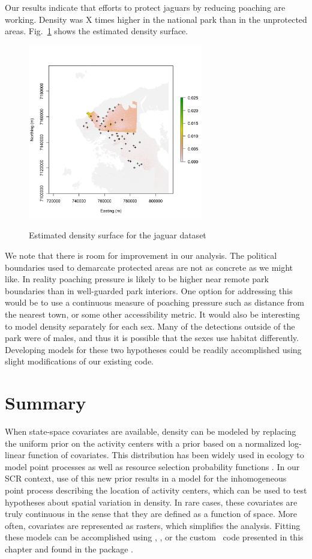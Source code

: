 Our results
indicate that efforts to protect jaguars by reducing poaching are
working. Density was X times higher in the national park than in the
unprotected areas. Fig.~\ref{ch9:fig:Dsurface} shows the estimated
density surface.

\begin{figure}
\centering
\includegraphics[width=3in,height=3in]{Ch11/figs/Dsurface34}
\label{ch9:fig:Dsurface}
\caption{Estimated density surface for the jaguar dataset}
\end{figure}


We note that there is room for improvement in our analysis. The
political boundaries used to demarcate protected areas are not as
concrete as we might like. In reality poaching pressure is likely to
be higher near remote park boundaries than in well-guarded park
interiors. One option
for addressing this would be to use a continuous measure of poaching
pressure such as distance from the nearest town, or some other
accessibility metric. It would also be interesting to model density
separately for each sex. Many of the detections outside of the park
were of males, and thus it is possible that the sexes use habitat
differently. Developing models for these two hypotheses could be
readily accomplished using slight modifications of our existing code.





\section{Summary}

When state-space covariates are available,
density can be modeled by replacing the uniform prior on the activity
centers with a
prior based on a normalized log-linear function of covariates. This
distribution has been widely used in ecology to model point processes
as well as resource selection probability functions
\citep{manly_etal:2002,lele_keim:2006}. In our SCR
context, use of this new prior results in
a model for the inhomogeneous point process describing the
location of activity centers, which can be used to test hypotheses
about spatial variation in density. In
rare cases, these covariates are truly continuous in the sense that
they are defined as a function of space. More often, covariates are
represented as rasters, which simplifies the analysis. Fitting these
models can be accomplished using \bugs, \secr, or the custom \R~code
presented in this chapter and found in the package \scrbook.

